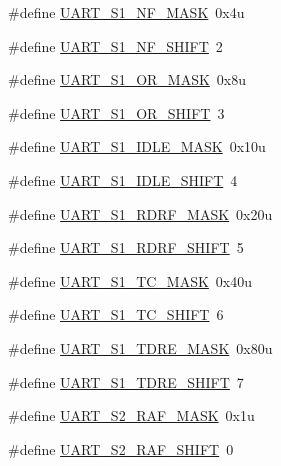 \begin{DoxyCompactItemize}
\item 
\#define \hyperlink{group___u_a_r_t___register___masks_gadfaa4f856facd373c0441b6e89bd87ba}{U\+A\+R\+T\+\_\+\+S1\+\_\+\+N\+F\+\_\+\+M\+A\+SK}~0x4u
\item 
\#define \hyperlink{group___u_a_r_t___register___masks_ga7b2eb195cce2f086cd1b0c136eced375}{U\+A\+R\+T\+\_\+\+S1\+\_\+\+N\+F\+\_\+\+S\+H\+I\+FT}~2
\item 
\#define \hyperlink{group___u_a_r_t___register___masks_gac8102fb901477551dcc8505b3afb5272}{U\+A\+R\+T\+\_\+\+S1\+\_\+\+O\+R\+\_\+\+M\+A\+SK}~0x8u
\item 
\#define \hyperlink{group___u_a_r_t___register___masks_ga34422d4914b457201229c9e14c74ced6}{U\+A\+R\+T\+\_\+\+S1\+\_\+\+O\+R\+\_\+\+S\+H\+I\+FT}~3
\item 
\#define \hyperlink{group___u_a_r_t___register___masks_gac1b555f14295616d01152013fe7704b9}{U\+A\+R\+T\+\_\+\+S1\+\_\+\+I\+D\+L\+E\+\_\+\+M\+A\+SK}~0x10u
\item 
\#define \hyperlink{group___u_a_r_t___register___masks_gaf3efb8b468c18b3060dfc91b94256f82}{U\+A\+R\+T\+\_\+\+S1\+\_\+\+I\+D\+L\+E\+\_\+\+S\+H\+I\+FT}~4
\item 
\#define \hyperlink{group___u_a_r_t___register___masks_gab62f7e1b8548b5bbe5686f31c4beae61}{U\+A\+R\+T\+\_\+\+S1\+\_\+\+R\+D\+R\+F\+\_\+\+M\+A\+SK}~0x20u
\item 
\#define \hyperlink{group___u_a_r_t___register___masks_ga346046d0c13d06cc9c382967d1efc56e}{U\+A\+R\+T\+\_\+\+S1\+\_\+\+R\+D\+R\+F\+\_\+\+S\+H\+I\+FT}~5
\item 
\#define \hyperlink{group___u_a_r_t___register___masks_ga8a78686c3c82eeb352b85f0699361558}{U\+A\+R\+T\+\_\+\+S1\+\_\+\+T\+C\+\_\+\+M\+A\+SK}~0x40u
\item 
\#define \hyperlink{group___u_a_r_t___register___masks_ga400fc3dbecf13c75447bbc006c49bdbc}{U\+A\+R\+T\+\_\+\+S1\+\_\+\+T\+C\+\_\+\+S\+H\+I\+FT}~6
\item 
\#define \hyperlink{group___u_a_r_t___register___masks_gaa7d30e83d1a7d0a544393186508a667e}{U\+A\+R\+T\+\_\+\+S1\+\_\+\+T\+D\+R\+E\+\_\+\+M\+A\+SK}~0x80u
\item 
\#define \hyperlink{group___u_a_r_t___register___masks_ga5c58dab9e10b6e9c41ecf6999b56ea0c}{U\+A\+R\+T\+\_\+\+S1\+\_\+\+T\+D\+R\+E\+\_\+\+S\+H\+I\+FT}~7
\item 
\#define \hyperlink{group___u_a_r_t___register___masks_gaa16c5c48ff5ecf080e485880145828c0}{U\+A\+R\+T\+\_\+\+S2\+\_\+\+R\+A\+F\+\_\+\+M\+A\+SK}~0x1u
\item 
\#define \hyperlink{group___u_a_r_t___register___masks_ga0eb8d9ed83a7cb0ed2edc0d3906ac5f1}{U\+A\+R\+T\+\_\+\+S2\+\_\+\+R\+A\+F\+\_\+\+S\+H\+I\+FT}~0

\end{DoxyCompactItemize}
